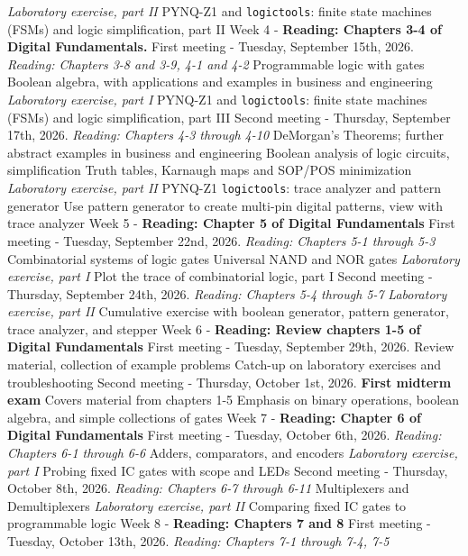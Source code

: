 \documentclass[10pt]{article}
\begin{document}
\begin{outline}[enumerate]
\3 \textit{Laboratory exercise, part II}
\4 PYNQ-Z1 and \verb+logictools+: finite state machines (FSMs) and logic simplification, part II
\clearpage
\1 Week 4 - \textbf{Reading: Chapters 3-4 of Digital Fundamentals.}
\2 First meeting - Tuesday, September 15th, 2026. \textit{Reading: Chapters 3-8 and 3-9, 4-1 and 4-2}
\3 Programmable logic with gates
\3 Boolean algebra, with applications and examples in business and engineering
\3 \textit{Laboratory exercise, part I}
\4 PYNQ-Z1 and \verb+logictools+: finite state machines (FSMs) and logic simplification, part III
\2 Second meeting - Thursday, September 17th, 2026. \textit{Reading: Chapters 4-3 through 4-10}
\3 DeMorgan's Theorems; further abstract examples in business and engineering
\3 Boolean analysis of logic circuits, simplification
\3 Truth tables, Karnaugh maps and SOP/POS minimization
\3 \textit{Laboratory exercise, part II}
\4 PYNQ-Z1 \verb+logictools+: trace analyzer and pattern generator
\4 Use pattern generator to create multi-pin digital patterns, view with trace analyzer
\1 Week 5 - \textbf{Reading: Chapter 5 of Digital Fundamentals}
\2 First meeting - Tuesday, September 22nd, 2026. \textit{Reading: Chapters 5-1 through 5-3}
\3 Combinatorial systems of logic gates
\3 Universal NAND and NOR gates
\3 \textit{Laboratory exercise, part I}
\4 Plot the trace of combinatorial logic, part I
\2 Second meeting - Thursday, September 24th, 2026. \textit{Reading: Chapters 5-4 through 5-7}
\3 \textit{Laboratory exercise, part II}
\4 Cumulative exercise with boolean generator, pattern generator, trace analyzer, and stepper
\1 Week 6 - \textbf{Reading: Review chapters 1-5 of Digital Fundamentals}
\2 First meeting - Tuesday, September 29th, 2026.
\3 Review material, collection of example problems
\3 Catch-up on laboratory exercises and troubleshooting
\2 Second meeting - Thursday, October 1st, 2026.
\3 \textbf{First midterm exam}
\4 Covers material from chapters 1-5
\4 Emphasis on binary operations, boolean algebra, and simple collections of gates
\1 Week 7 - \textbf{Reading: Chapter 6 of Digital Fundamentals}
\2 First meeting - Tuesday, October 6th, 2026. \textit{Reading: Chapters 6-1 through 6-6}
\3 Adders, comparators, and encoders
\3 \textit{Laboratory exercise, part I}
\4 Probing fixed IC gates with scope and LEDs
\2 Second meeting - Thursday, October 8th, 2026. \textit{Reading: Chapters 6-7 through 6-11}
\3 Multiplexers and Demultiplexers
\3 \textit{Laboratory exercise, part II}
\4 Comparing fixed IC gates to programmable logic
\1 Week 8 - \textbf{Reading: Chapters 7 and 8}
\2 First meeting - Tuesday, October 13th, 2026. \textit{Reading: Chapters 7-1 through 7-4, 7-5}

\end{outline}
\end{document}
